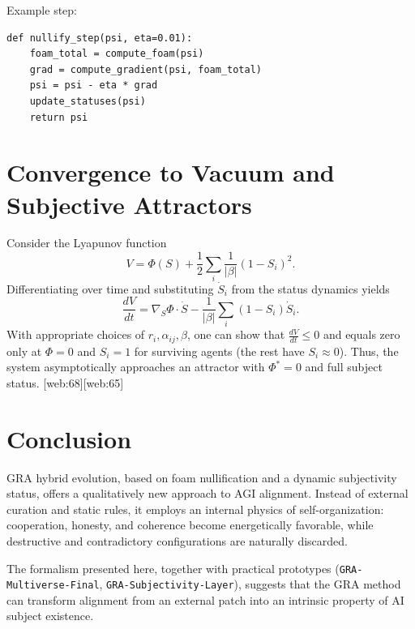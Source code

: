 \documentclass[11pt,a4paper]{article}
\begin{document}
Example step:
\begin{verbatim}
def nullify_step(psi, eta=0.01):
    foam_total = compute_foam(psi)
    grad = compute_gradient(psi, foam_total)
    psi = psi - eta * grad
    update_statuses(psi)
    return psi
\end{verbatim}

\section{Convergence to Vacuum and Subjective Attractors}

Consider the Lyapunov function
\begin{equation}
V = \Phi(S) + \frac{1}{2}\sum_i \frac{1}{|\beta|} (1 - S_i)^2.
\end{equation}
Differentiating over time and substituting $\dot S_i$ from the status dynamics yields
\begin{equation}
\frac{dV}{dt} = \nabla_S\Phi \cdot \dot S - \frac{1}{|\beta|}\sum_i (1-S_i)\dot S_i.
\end{equation}
With appropriate choices of $r_i, \alpha_{ij}, \beta$, one can show that $\frac{dV}{dt}\le 0$ and equals zero only at $\Phi=0$ and $S_i=1$ for surviving agents (the rest have $S_i\approx 0$).
Thus, the system asymptotically approaches an attractor with $\Phi^*=0$ and full subject status. [web:68][web:65]

\section{Conclusion}

GRA hybrid evolution, based on foam nullification and a dynamic subjectivity status, offers a qualitatively new approach to AGI alignment.
Instead of external curation and static rules, it employs an internal physics of self-organization: cooperation, honesty, and coherence become energetically favorable, while destructive and contradictory configurations are naturally discarded.

The formalism presented here, together with practical prototypes (\texttt{GRA-Multiverse-Final}, \texttt{GRA-Subjectivity-Layer}), suggests that the GRA method can transform alignment from an external patch into an intrinsic property of AI subject existence.


\end{document}
